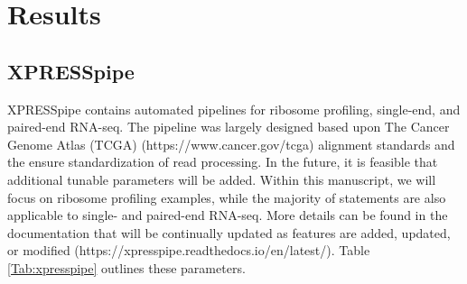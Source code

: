 \documentclass[11pt, a4paper, oneside]{article}
\begin{document}
\section{Results}

\subsection{XPRESSpipe}
XPRESSpipe contains automated pipelines for ribosome profiling, single-end, and paired-end RNA-seq. The pipeline was largely designed based upon The Cancer Genome Atlas (TCGA) (https://www.cancer.gov/tcga) alignment standards and the ensure standardization of read processing. In the future, it is feasible that additional tunable parameters will be added. Within this manuscript, we will focus on ribosome profiling examples, while the majority of statements are also applicable to single- and paired-end RNA-seq. More details can be found in the documentation that will be continually updated as features are added, updated, or modified (https://xpresspipe.readthedocs.io/en/latest/). Table \ref{Tab:xpresspipe} outlines these parameters.
\end{document}
